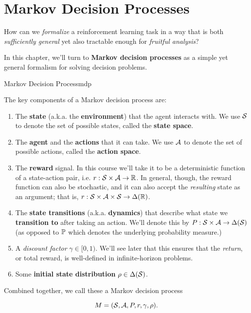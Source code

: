 \documentclass[../main/main]{subfiles}
\begin{document}
    
\chapter{Markov Decision Processes}



How can we \emph{formalize} a reinforcement learning task in a way that is both \emph{sufficiently general} yet also tractable enough for \emph{fruitful analysis}?

In this chapter, we'll turn to \textbf{Markov decision processes} as a simple yet general formalism for solving decision problems.

\begin{definition}{Markov Decision Process}{mdp}
    
The key components of a Markov decision process are:

\begin{enumerate}
    \item The \textbf{state} (a.k.a. the \textbf{environment}) that the agent interacts with. We use $\S$ to denote the set of possible states, called the \textbf{state space}.
    \item The \textbf{agent} and the \textbf{actions} that it can take. We use $\A$ to denote the set of possible actions, called the \textbf{action space}.
    \item The \textbf{reward} signal. In this course we'll take it to be a deterministic function of a state-action pair, i.e. $r : \S \times \A \to \mathbb{R}$. In general, though, the reward function can also be stochastic, and it can also accept the \emph{resulting} state as an argument; that is, $r : \S \times \A \times \S \to \Delta(\R)$.
    \item The \textbf{state transitions} (a.k.a. \textbf{dynamics}) that describe what state we \textbf{transition to} after taking an action. We'll denote this by $P : \S \times \A \to \Delta(\S)$ (as opposed to $\P$ which denotes the underlying probability measure.)
    \item A \emph{discount factor} $\gamma \in [0, 1)$. We'll see later that this ensures that the \emph{return}, or total reward, is well-defined in infinite-horizon problems.
    \item Some \textbf{initial state distribution} $\rho \in \Delta(\S)$.
\end{enumerate}

Combined together, we call these a Markov decision process

\[
    M = (\S, \A, P, r, \gamma, \rho).
\]

\end{definition}
\end{document}
